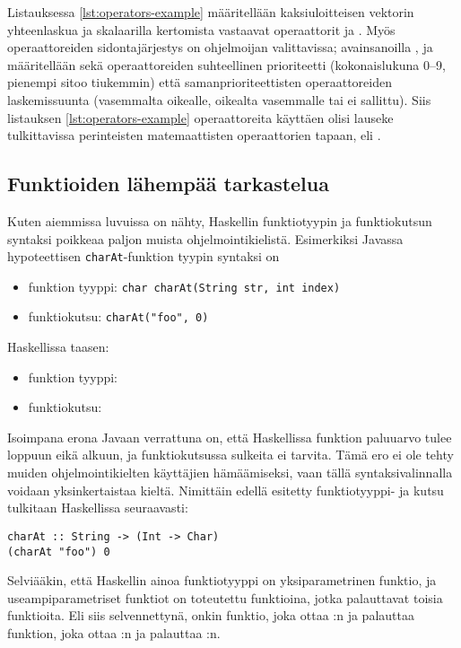 Listauksessa \ref{lst:operators-example} määritellään kaksiuloitteisen vektorin yhteenlaskua
ja skalaarilla kertomista vastaavat operaattorit \Haskell{<+>} ja .
Myös operaattoreiden sidontajärjestys on ohjelmoijan valittavissa;
avainsanoilla ,  ja  määritellään sekä
operaattoreiden suhteellinen prioriteetti (kokonaislukuna 0--9, pienempi sitoo tiukemmin) että
samanprioriteettisten operaattoreiden laskemissuunta
(vasemmalta oikealle, oikealta vasemmalle tai ei sallittu).
Siis listauksen \ref{lst:operators-example} operaattoreita käyttäen olisi lauseke
 tulkittavissa perinteisten matemaattisten operaattorien tapaan,
eli .

\subsection{Funktioiden lähempää tarkastelua}
Kuten aiemmissa luvuissa on nähty,
Haskellin funktiotyypin ja funktiokutsun syntaksi poikkeaa paljon muista ohjelmointikielistä.
Esimerkiksi Javassa hypoteettisen \texttt{charAt}-funktion tyypin syntaksi on

\begin{itemize}
    \item funktion tyyppi: \texttt{char charAt(String str, int index)}
    \item funktiokutsu: \texttt{charAt("foo", 0)}
\end{itemize}
Haskellissa taasen:
\begin{itemize}
    \item funktion tyyppi: 
    \item funktiokutsu: 
\end{itemize}

Isoimpana erona Javaan verrattuna on, että Haskellissa funktion paluuarvo tulee loppuun eikä alkuun,
ja funktiokutsussa sulkeita ei tarvita.
Tämä ero ei ole tehty muiden ohjelmointikielten käyttäjien hämäämiseksi,
vaan tällä syntaksivalinnalla voidaan yksinkertaistaa kieltä.
Nimittäin edellä esitetty funktiotyyppi- ja kutsu tulkitaan Haskellissa seuraavasti:

\begin{verbatim}
charAt :: String -> (Int -> Char)
(charAt "foo") 0
\end{verbatim}

Selviääkin, että Haskellin ainoa funktiotyyppi on yksiparametrinen funktio,
ja useampiparametriset funktiot on toteutettu funktioina, jotka palauttavat toisia funktioita.
Eli siis selvennettynä,
 onkin funktio, joka ottaa :n ja palauttaa funktion,
joka ottaa :n ja palauttaa :n.

